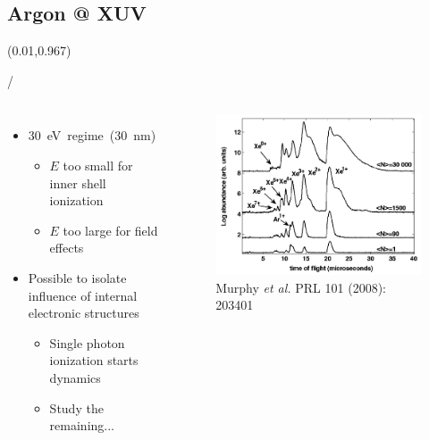 \documentclass{beamer}
\makeatletter
\newcommand{\framenumber}{
\begin{textblock}{0}(0.01,0.967)
\begin{scriptsize}
{\color{gray}\insertframenumber/\inserttotalframenumber}
\end{scriptsize}
\end{textblock}
}
\makeatother
\begin{document}
\subsection{Argon @ XUV}
\begin{frame}{}\framenumber
\begin{columns}
		\begin{itemize}
		\item 30~eV~regime~(30~nm)
			\begin{itemize}
			\item $E$ too small for inner shell ionization
			\item $E$ too large for field effects
			\end{itemize}
		\item Possible to isolate influence of internal electronic structures
		\begin{itemize}
			\item Single photon ionization starts dynamics
			\item Study the remaining...
		\end{itemize}
		\end{itemize}

		\begin{figure}
			\includegraphics[width=\textwidth]{figures/Murphy2008_fig3}
			\caption{{\tiny Murphy \textit{et al.} PRL 101 (2008): 203401}}
		\end{figure}
\end{columns}
\end{frame}
\end{document}
